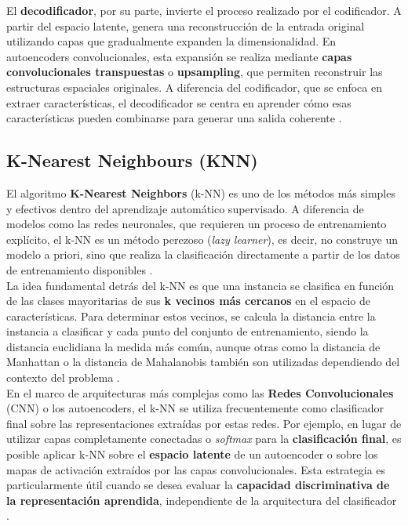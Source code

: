 \documentclass[12pt]{article} %
\begin{document}
El \textbf{decodificador}, por su parte, invierte el proceso realizado por el codificador. A partir del espacio latente, genera una reconstrucción de la entrada original utilizando capas que gradualmente expanden la dimensionalidad. En autoencoders convolucionales, esta expansión se realiza mediante \textbf{capas convolucionales transpuestas} o \textbf{upsampling}, que permiten reconstruir las estructuras espaciales originales. A diferencia del codificador, que se enfoca en extraer características, el decodificador se centra en aprender cómo esas características pueden combinarse para generar una salida coherente \cite{masci2011stacked}. \\

\subsection{K-Nearest Neighbours (KNN)}
El algoritmo \textbf{K-Nearest Neighbors} (k-NN) es uno de los métodos más simples y efectivos dentro del aprendizaje automático supervisado. A diferencia de modelos como las redes neuronales, que requieren un proceso de entrenamiento explícito, el k-NN es un método perezoso (\textit{lazy learner}), es decir, no construye un modelo a priori, sino que realiza la clasificación directamente a partir de los datos de entrenamiento disponibles \cite{cover1967nearest}. \\

La idea fundamental detrás del k-NN es que una instancia se clasifica en función de las clases mayoritarias de sus \textbf{k vecinos más cercanos} en el espacio de características. Para determinar estos vecinos, se calcula la distancia entre la instancia a clasificar y cada punto del conjunto de entrenamiento, siendo la distancia euclidiana la medida más común, aunque otras como la distancia de Manhattan o la distancia de Mahalanobis también son utilizadas dependiendo del contexto del problema \cite{chomboon2015empirical}. \\

En el marco de arquitecturas más complejas como las \textbf{Redes Convolucionales} (CNN) o los autoencoders, el k-NN se utiliza frecuentemente como clasificador final sobre las representaciones extraídas por estas redes. Por ejemplo, en lugar de utilizar capas completamente conectadas o \textit{softmax} para la \textbf{clasificación final}, es posible aplicar k-NN sobre el \textbf{espacio latente} de un autoencoder o sobre los mapas de activación extraídos por las capas convolucionales. Esta estrategia es particularmente útil cuando se desea evaluar la \textbf{capacidad discriminativa de la representación aprendida}, independiente de la arquitectura del clasificador \cite{van2009dimensionality}. \\
\end{document}
